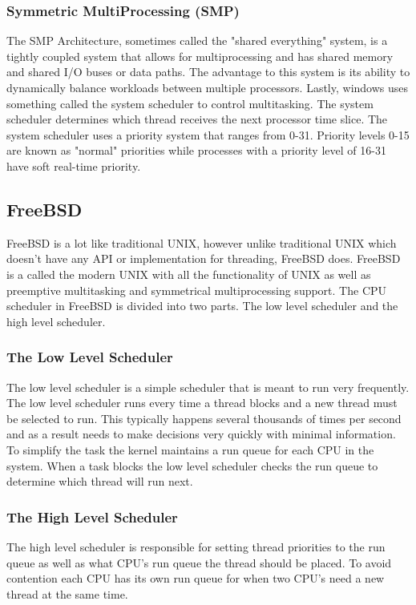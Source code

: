 \documentclass[a4paper,10pt,onecolumn]{article}
\begin{document}
\subsubsection{{S}ymmetric {M}ulti{P}rocessing {(SMP)}}
The SMP Architecture, sometimes called the "shared everything" system, is a tightly coupled system that allows for multiprocessing and has shared memory and shared I/O buses or data paths. The advantage to this system is its ability to dynamically balance workloads between multiple processors.
\newline
\newline
Lastly, windows uses something called the system scheduler to control multitasking. The system scheduler determines which thread receives the next processor time slice. The system scheduler uses a priority system that ranges from 0-31. Priority levels 0-15 are known as "normal" priorities while processes with a priority level of 16-31 have soft real-time priority.\cite{wikipedia_2018}
\newline
\newline
\subsection{FreeBSD}
FreeBSD is a lot like traditional UNIX, however unlike traditional UNIX which doesn't have any API or implementation for threading, FreeBSD does. FreeBSD is a called the modern UNIX with all the functionality of UNIX as well as preemptive multitasking and symmetrical multiprocessing support.\cite{bsd}
\newline
\newline
The CPU scheduler in FreeBSD is divided into two parts. The low level scheduler and the high level scheduler.
\subsubsection{The Low Level Scheduler}
The low level scheduler is a simple scheduler that is meant to run very frequently. The low level scheduler runs every time a thread blocks and a new thread must be selected to run. This typically happens several thousands of times per second and as a result needs to make decisions very quickly with minimal information. To simplify the task the kernel maintains a run queue for each CPU in the system. When a task blocks the low level scheduler checks the run queue to determine which thread will run next.
\newline
\subsubsection{The High Level Scheduler}
The high level scheduler is responsible for setting thread priorities to the run queue as well as what CPU's run queue the thread should be placed. To avoid contention each CPU has its own run queue for when two CPU's need a new thread at the same time. 
\newline
\newline
\end{document}
